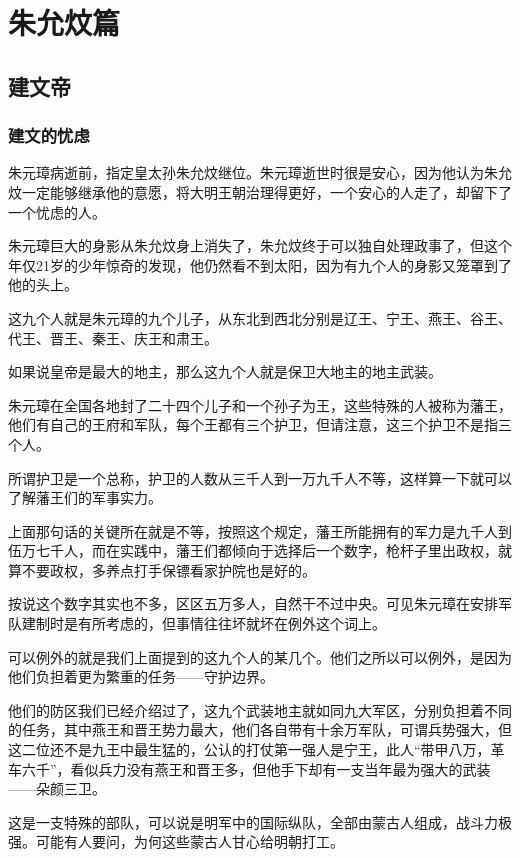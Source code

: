 \chapter*{朱允炆篇}
\section{建文帝}
\ifnum{}
	\begin{multicols}{\theparacolNo}
		\fi
		\subsection{建文的忧虑}
		朱元璋病逝前，指定皇太孙朱允炆继位。朱元璋逝世时很是安心，因为他认为朱允炆一定能够继承他的意愿，将大明王朝治理得更好，一个安心的人走了，却留下了一个忧虑的人。

		朱元璋巨大的身影从朱允炆身上消失了，朱允炆终于可以独自处理政事了，但这个年仅21岁的少年惊奇的发现，他仍然看不到太阳，因为有九个人的身影又笼罩到了他的头上。

		这九个人就是朱元璋的九个儿子，从东北到西北分别是辽王、宁王、燕王、谷王、代王、晋王、秦王、庆王和肃王。

		如果说皇帝是最大的地主，那么这九个人就是保卫大地主的地主武装。

		朱元璋在全国各地封了二十四个儿子和一个孙子为王，这些特殊的人被称为藩王，他们有自己的王府和军队，每个王都有三个护卫，但请注意，这三个护卫不是指三个人。

		所谓护卫是一个总称，护卫的人数从三千人到一万九千人不等，这样算一下就可以了解藩王们的军事实力。

		上面那句话的关键所在就是不等，按照这个规定，藩王所能拥有的军力是九千人到伍万七千人，而在实践中，藩王们都倾向于选择后一个数字，枪杆子里出政权，就算不要政权，多养点打手保镖看家护院也是好的。

		按说这个数字其实也不多，区区五万多人，自然干不过中央。可见朱元璋在安排军队建制时是有所考虑的，但事情往往坏就坏在例外这个词上。

		可以例外的就是我们上面提到的这九个人的某几个。他们之所以可以例外，是因为他们负担着更为繁重的任务——守护边界。

		他们的防区我们已经介绍过了，这九个武装地主就如同九大军区，分别负担着不同的任务，其中燕王和晋王势力最大，他们各自带有十余万军队，可谓兵势强大，但这二位还不是九王中最生猛的，公认的打仗第一强人是宁王，此人“带甲八万，革车六千”，看似兵力没有燕王和晋王多，但他手下却有一支当年最为强大的武装——朵颜三卫。

		这是一支特殊的部队，可以说是明军中的国际纵队，全部由蒙古人组成，战斗力极强。可能有人要问，为何这些蒙古人甘心给明朝打工。


\end{multicols}
